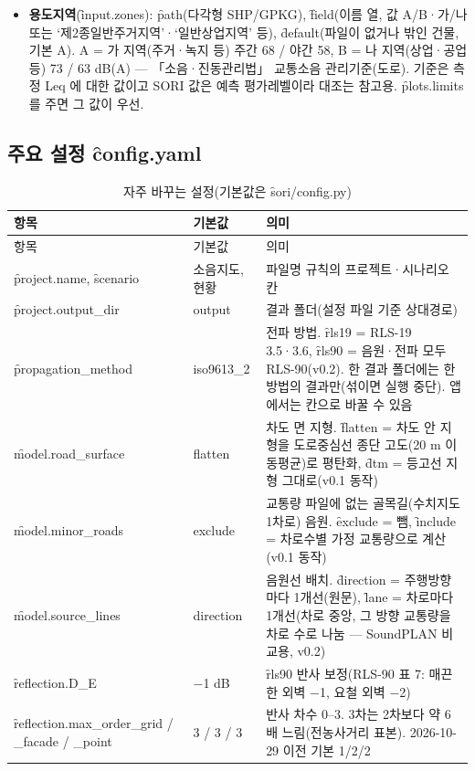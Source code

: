 \documentclass[10.5pt,a4paper]{article}
\begin{document}
\begin{itemize}
\item \textbf{용도지역}(\f{input.zones}): \f{path}(다각형 SHP/GPKG), \f{field}(이름 열, 값 A/B·가/나 또는 ‘제2종일반주거지역’·‘일반상업지역’ 등), \f{default}(파일이 없거나 밖인 건물, 기본 A). A = 가 지역(주거·녹지 등) 주간 68 / 야간 58, B = 나 지역(상업·공업 등) 73 / 63 dB(A) — 「소음·진동관리법」 교통소음 관리기준(도로). 기준은 측정 Leq 에 대한 값이고 SORI 값은 예측 평가레벨이라 대조는 참고용. \f{plots.limits} 를 주면 그 값이 우선.
\end{itemize}

\subsection{주요 설정 \f{config.yaml}}
\begin{longtable}{P{48mm}P{22mm}P{82mm}}
\caption{자주 바꾸는 설정(기본값은 \f{sori/config.py})}\label{tab:cfg}\\
\toprule 항목 & 기본값 & 의미 \\ \midrule\endfirsthead
\toprule 항목 & 기본값 & 의미 \\ \midrule\endhead
\f{project.name}, \f{scenario} & 소음지도, 현황 & 파일명 규칙의 프로젝트·시나리오 칸 \\
\f{project.output\_dir} & output & 결과 폴더(설정 파일 기준 상대경로) \\
\f{propagation\_method} & iso9613\_2 & 전파 방법. \f{rls19} = RLS-19 3.5·3.6, \f{rls90} = 음원·전파 모두 RLS-90(v0.2). 한 결과 폴더에는 한 방법의 결과만(섞이면 실행 중단). 앱에서는  칸으로 바꿀 수 있음 \\
\f{model.road\_surface} & flatten & 차도 면 지형. \f{flatten} = 차도 안 지형을 도로중심선 종단 고도(20 m 이동평균)로 평탄화, \f{dtm} = 등고선 지형 그대로(v0.1 동작) \\
\f{model.minor\_roads} & exclude & 교통량 파일에 없는 골목길(수치지도 1차로) 음원. \f{exclude} = 뺌, \f{include} = 차로수별 가정 교통량으로 계산(v0.1 동작) \\
\f{model.source\_lines} & direction & 음원선 배치. \f{direction} = 주행방향마다 1개선(원문), \f{lane} = 차로마다 1개선(차로 중앙, 그 방향 교통량을 차로 수로 나눔 — SoundPLAN 비교용, v0.2) \\
\f{reflection.D\_E} & −1 dB & \f{rls90} 반사 보정(RLS-90 표 7: 매끈한 외벽 −1, 요철 외벽 −2) \\
\f{reflection.max\_order\_grid / \_facade / \_point} & 3 / 3 / 3 & 반사 차수 0–3. 3차는 2차보다 약 6배 느림(전농사거리 표본). 2026-10-29 이전 기본 1/2/2 \\

\end{longtable}
\end{document}
